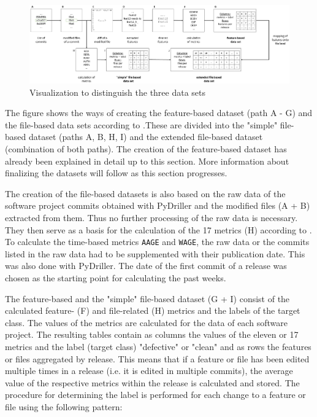 \begin{figure}[ht]
    \centering
    \includegraphics[width=\textwidth]{Dataset}
    \caption{Visualization to distinguish the three data sets\label{fig:dataset}}
\end{figure}

The figure shows the ways of creating the feature-based dataset (path A - G) and the file-based data sets according  to \cite{Moser2008}.These are divided into the "simple" file-based dataset (paths A, B, H, I) and the extended file-based dataset (combination of both paths).  The creation of the feature-based dataset has already been explained in detail up to this section. More information about finalizing the datasets will follow as this section progresses.

The creation of the file-based datasets is also based on the raw data of the software project commits obtained with PyDriller and the modified files (A + B) extracted from them. Thus no further processing of the raw data is necessary. They then serve as a basis for the calculation of the 17 metrics (H) according to \cite{Moser2008}. To calculate the time-based metrics \texttt{AAGE} and \texttt{WAGE}, the raw data or the commits listed in the raw data had to be supplemented with their publication date. This was also done with PyDriller. The date of the first commit of a release was chosen as the starting point for calculating the past weeks.

The feature-based and the "simple" file-based dataset (G + I) consist of the calculated feature- (F) and file-related (H) metrics and the labels of the target class. The values of the metrics are calculated for the data of each software project. The resulting tables contain as columns the values of the eleven or 17 metrics and the label (target class) "defective" or "clean" and as rows the features or files aggregated by release.  This means that if a feature or file has been edited multiple times in a release (i.e. it is edited in multiple commits), the average value of the respective metrics within the release is calculated and stored. The procedure for determining the label is performed for each change to a feature or file using the following pattern:

